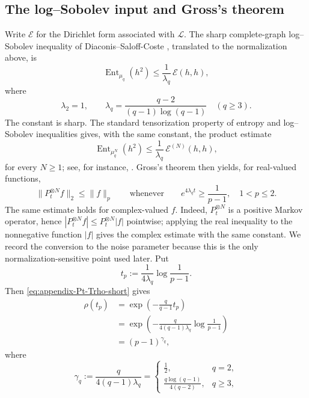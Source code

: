 \documentclass[11pt,a4paper]{article}
\numberwithin{equation}{section}
\theoremstyle{cleanplain}
\theoremstyle{cleandefinition}
\theoremstyle{cleanremark}
\begin{document}
{\subsection{The log--Sobolev input and Gross's theorem}

Write $\mathcal E$ for the Dirichlet form associated with $\mathcal L$.  The
sharp complete-graph log--Sobolev inequality of Diaconis--Saloff-Coste
\cite{DSC}, translated to the normalization above, is
\begin{equation}\label{eq:appendix-LSI-short}
 \operatorname{Ent}_{\mu_q}(h^2)
 \leq \frac1{\lambda_q}\,\mathcal E(h,h),
\end{equation}
where
\begin{equation}\label{eq:appendix-lambda-short}
 \lambda_2=1,
 \qquad
 \lambda_q=\frac{q-2}{(q-1)\log(q-1)}\quad(q\geq3).
\end{equation}
The constant is sharp.  The standard tensorization property of entropy and
log--Sobolev inequalities gives, with the same constant, the product estimate
\[
 \operatorname{Ent}_{\mu_q^N}(h^2)
 \leq \frac1{\lambda_q}\,\mathcal E^{(N)}(h,h),
\]
for every $N\geq1$; see, for instance, \cite{DSC}.  Gross's theorem
\cite{Gross} then yields, for real-valued functions,
\begin{equation}\label{eq:appendix-Gross-short}
 \|P_t^{\otimes N}f\|_2\leq\|f\|_p
 \qquad\text{whenever}\qquad
 e^{4\lambda_qt}\geq\frac1{p-1},
 \quad 1<p\leq2.
\end{equation}
{\color{black}The same estimate holds for complex-valued $f$.  Indeed,
$P_t^{\otimes N}$ is a positive Markov operator, hence
$|P_t^{\otimes N}f|\leq P_t^{\otimes N}|f|$ pointwise; applying the real
inequality to the nonnegative function $|f|$ gives the complex estimate with
the same constant.}
We record the conversion to the noise parameter because this is the only
normalization-sensitive point used later.  Put
\[
 t_p:=\frac1{4\lambda_q}\log\frac1{p-1}.
\]
Then \eqref{eq:appendix-Pt-Trho-short} gives
\begin{align*}
 \rho(t_p)
 &=\exp\left(-\frac q{q-1}t_p\right)\\
 &=\exp\left(
 -\frac{q}{4(q-1)\lambda_q}\log\frac1{p-1}
 \right)\\
 &=(p-1)^{\gamma_q},
\end{align*}
where
\[
 \gamma_q:=\frac{q}{4(q-1)\lambda_q}
 =
 \begin{cases}
 \frac12,&q=2,\\[1mm]
 \displaystyle\frac{q\log(q-1)}{4(q-2)},&q\geq3,
 \end{cases}
\]}
\end{document}
